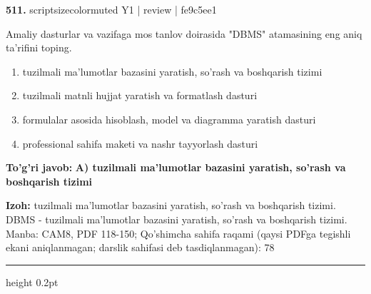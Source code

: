 \documentclass[10pt,a4paper]{article}
\begin{document}
{\bfseries\sffamily\color{ink} 511.} {scriptsizecolor{muted} Y1 | review | fe9c5ee1}
\par
Amaliy dasturlar va vazifaga mos tanlov doirasida "DBMS" atamasining eng aniq ta'rifini toping.
\begin{enumerate}[label=\Alph*),leftmargin=9mm]
\item tuzilmali ma'lumotlar bazasini yaratish, so'rash va boshqarish tizimi
\item tuzilmali matnli hujjat yaratish va formatlash dasturi
\item formulalar asosida hisoblash, model va diagramma yaratish dasturi
\item professional sahifa maketi va nashr tayyorlash dasturi
\end{enumerate}
\begin{tcolorbox}[enhanced,breakable,colback=teal!4,colframe=teal!60!black,boxrule=0.45pt,arc=1.2mm,left=2.7mm,right=2.7mm,top=1.8mm,bottom=1.8mm,before skip=2mm,after skip=2mm]
{\bfseries\sffamily\color{teal}To'g'ri javob:} \textbf{A) tuzilmali ma'lumotlar bazasini yaratish, so'rash va boshqarish tizimi}
\par\smallskip
{\bfseries Izoh:} tuzilmali ma'lumotlar bazasini yaratish, so'rash va boshqarish tizimi. DBMS - tuzilmali ma'lumotlar bazasini yaratish, so'rash va boshqarish tizimi. Manba: CAM8, PDF 118-150; Qo'shimcha sahifa raqami (qaysi PDFga tegishli ekani aniqlanmagan; darslik sahifasi deb tasdiqlanmagan): 78
\end{tcolorbox}
\vspace{2mm}\hrule height 0.2pt\vspace{3mm}
\end{document}
